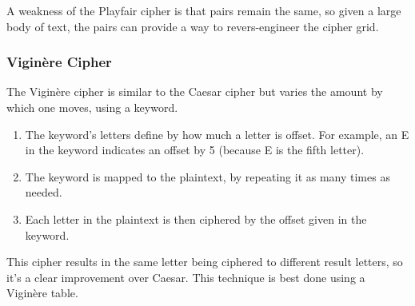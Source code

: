 A weakness of the Playfair cipher is that pairs remain the same, so given a large body of text, the pairs can provide a way to revers-engineer the cipher grid.


\subsubsection{Viginère Cipher}

The Viginère cipher is similar to the Caesar cipher but varies the amount by which one moves, using a keyword.
\begin{enumerate}
    \item The keyword's letters define by how much a letter is offset. For example, an E in the keyword indicates an offset by 5 (because E is the fifth letter).
    \item The keyword is mapped to the plaintext, by repeating it as many times as needed.
    \item Each letter in the plaintext is then ciphered by the offset given in the keyword.
\end{enumerate}

This cipher results in the same letter being ciphered to different result letters, so it's a clear improvement over Caesar. This technique is best done using a Viginère table.




